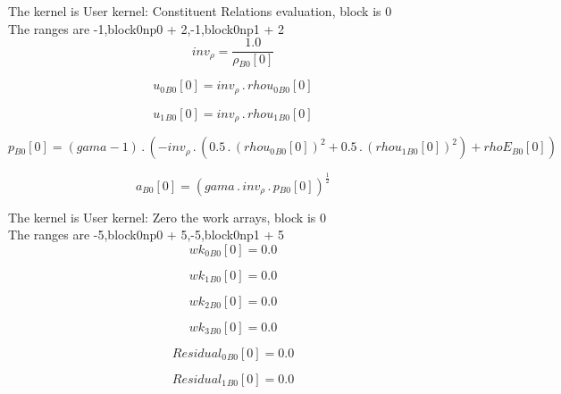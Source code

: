 \documentclass{article}
\begin{document}
\noindent The kernel is User kernel: Constituent Relations evaluation, block is 0\\\noindent The ranges are -1,block0np0 + 2,-1,block0np1 + 2\\\begin{dmath}inv_{\rho} = \frac{1.0}{{\rho{_{B0}}}[{0}]}\end{dmath}

\begin{dmath}{u_{0}{_{B0}}}[{0}] = inv_{\rho} \,.\, {rhou_{0}{_{B0}}}[{0}]\end{dmath}

\begin{dmath}{u_{1}{_{B0}}}[{0}] = inv_{\rho} \,.\, {rhou_{1}{_{B0}}}[{0}]\end{dmath}

\begin{dmath}{p{_{B0}}}[{0}] = \left(gama - 1\right) \,.\, \left(- inv_{\rho} \,.\, \left(0.5 \,.\, \left({rhou_{0}{_{B0}}}[{0}] \right)^{2} + 0.5 \,.\, \left({rhou_{1}{_{B0}}}[{0}] \right)^{2}\right) + {rhoE{_{B0}}}[{0}]\right)\end{dmath}

\begin{dmath}{a{_{B0}}}[{0}] = \left(gama \,.\, inv_{\rho} \,.\, {p{_{B0}}}[{0}] \right)^{\frac{1}{2}}\end{dmath}

\noindent The kernel is User kernel: Zero the work arrays, block is 0\\\noindent The ranges are -5,block0np0 + 5,-5,block0np1 + 5\\\begin{dmath}{wk_{0}{_{B0}}}[{0}] = 0.0\end{dmath}

\begin{dmath}{wk_{1}{_{B0}}}[{0}] = 0.0\end{dmath}

\begin{dmath}{wk_{2}{_{B0}}}[{0}] = 0.0\end{dmath}

\begin{dmath}{wk_{3}{_{B0}}}[{0}] = 0.0\end{dmath}

\begin{dmath}{Residual_{0}{_{B0}}}[{0}] = 0.0\end{dmath}

\begin{dmath}{Residual_{1}{_{B0}}}[{0}] = 0.0\end{dmath}
\end{document}
